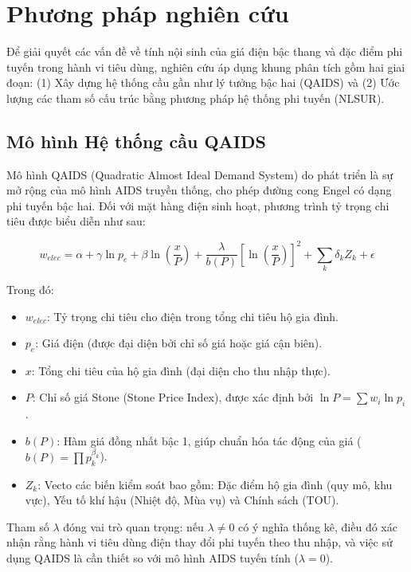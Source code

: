 \documentclass[12pt,a4paper,oneside]{article}
\begin{document}
\section{Phương pháp nghiên cứu}

Để giải quyết các vấn đề về tính nội sinh của giá điện bậc thang và đặc điểm phi tuyến trong hành vi tiêu dùng, nghiên cứu áp dụng khung phân tích gồm hai giai đoạn: (1) Xây dựng hệ thống cầu gần như lý tưởng bậc hai (QAIDS) và (2) Ước lượng các tham số cấu trúc bằng phương pháp hệ thống phi tuyến (NLSUR).

\subsection{Mô hình Hệ thống cầu QAIDS}

Mô hình QAIDS (Quadratic Almost Ideal Demand System) do \textcite{banks1997} phát triển là sự mở rộng của mô hình AIDS truyền thống, cho phép đường cong Engel có dạng phi tuyến bậc hai. Đối với mặt hàng điện sinh hoạt, phương trình tỷ trọng chi tiêu được biểu diễn như sau:

\begin{equation}
	w_{elec} = \alpha + \gamma \ln p_e + \beta \ln\left(\frac{x}{P}\right) + \frac{\lambda}{b(P)} \left[\ln\left(\frac{x}{P}\right)\right]^2 + \sum_k \delta_k Z_k + \epsilon
\end{equation}

Trong đó:
\begin{itemize}
	\item $w_{elec}$: Tỷ trọng chi tiêu cho điện trong tổng chi tiêu hộ gia đình.
	\item $p_e$: Giá điện (được đại diện bởi chỉ số giá hoặc giá cận biên).
	\item $x$: Tổng chi tiêu của hộ gia đình (đại diện cho thu nhập thực).
	\item $P$: Chỉ số giá Stone (Stone Price Index), được xác định bởi $\ln P = \sum w_i \ln p_i$.
	\item $b(P)$: Hàm giá đồng nhất bậc 1, giúp chuẩn hóa tác động của giá ($b(P) = \prod p_k^{\beta_k}$).
	\item $Z_k$: Vecto các biến kiểm soát bao gồm: Đặc điểm hộ gia đình (quy mô, khu vực), Yếu tố khí hậu (Nhiệt độ, Mùa vụ) và Chính sách (TOU).
\end{itemize}

Tham số $\lambda$ đóng vai trò quan trọng: nếu $\lambda \neq 0$ có ý nghĩa thống kê, điều đó xác nhận rằng hành vi tiêu dùng điện thay đổi phi tuyến theo thu nhập, và việc sử dụng QAIDS là cần thiết so với mô hình AIDS tuyến tính ($\lambda=0$).
\end{document}
